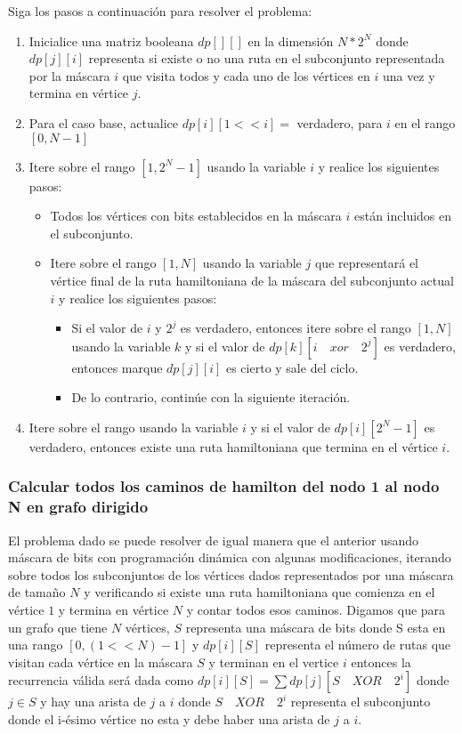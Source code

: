 Siga los pasos a continuación para resolver el problema:

\begin{enumerate}
	\item Inicialice una matriz booleana $dp[][]$ en la dimensión $N*2^N$ donde $dp[j][i]$ representa si existe o no una ruta en el subconjunto representada por la máscara $i$ que visita todos y cada uno de los vértices en $i$ una vez y termina en vértice $j$.
	\item Para el caso base, actualice $dp[i][1 << i] =$ verdadero, para $i$ en el rango $[0, N-1]$
	\item Itere sobre el rango $[1, 2^N-1]$ usando la variable $i$ y realice los siguientes pasos:
	\begin{itemize}
		\item Todos los vértices con bits establecidos en la máscara $i$ están incluidos en el subconjunto.
		\item Itere sobre el rango $[1, N]$ usando la variable $j$ que representará el vértice final de la ruta hamiltoniana de la máscara del subconjunto actual $i$ y realice los siguientes pasos:
		\begin{itemize}
			\item Si el valor de $i$ y $2^j$ es verdadero, entonces itere sobre el rango $[1, N]$ usando la variable $k$ y si el valor de $dp[k][i \quad xor \quad 2^j]$ es verdadero, entonces marque $dp[j][i]$ es cierto y sale del ciclo.
			\item De lo contrario, continúe con la siguiente iteración.
		\end{itemize}
	\end{itemize}
	\item Itere sobre el rango usando la variable $i$ y si el valor de $dp[i][2^N-1]$ es verdadero, entonces existe una ruta hamiltoniana que termina en el vértice $i$.
\end{enumerate}

\subsubsection{Calcular todos los caminos de hamilton del nodo 1 al nodo N en grafo dirigido}

El problema dado se puede resolver de igual manera que el anterior usando máscara de bits con programación dinámica con algunas modificaciones, iterando sobre todos los subconjuntos de los vértices dados representados por una máscara de tamaño $N$ y verificando si existe una ruta hamiltoniana que comienza en el vértice $1$ y termina en  vértice $N$  y contar todos esos caminos. Digamos que para un grafo que tiene $N$ vértices, $S$ representa una máscara de bits donde S esta en una rango $[0 , (1 << N)-1]$ y $dp[i][S]$ representa el número de rutas que visitan cada vértice en la máscara $S$ y terminan en el vertice $i$ entonces la recurrencia válida será dada como $dp[i][S] = \sum dp[j][S \quad XOR \quad 2^i]$ donde $j \in S$ y hay una arista de $j$ a $i$ donde $S \quad  XOR  \quad  2^i$ representa el subconjunto donde el i-ésimo vértice no esta y debe haber una arista de $j$ a $i$.

